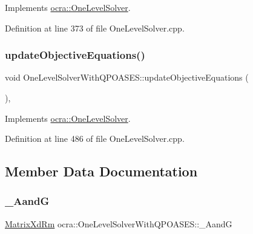 Implements \hyperlink{classocra_1_1OneLevelSolver_af592dc713af6cf22e67abcdfba09ca5e}{ocra\+::\+One\+Level\+Solver}.



Definition at line 373 of file One\+Level\+Solver.\+cpp.

\hypertarget{classocra_1_1OneLevelSolverWithQPOASES_a6a0e2cdfe22731fde09af26442a9cc85}{}\label{classocra_1_1OneLevelSolverWithQPOASES_a6a0e2cdfe22731fde09af26442a9cc85} 
\subsubsection{\texorpdfstring{update\+Objective\+Equations()}{updateObjectiveEquations()}}
{\footnotesize\ttfamily void One\+Level\+Solver\+With\+Q\+P\+O\+A\+S\+E\+S\+::update\+Objective\+Equations (\begin{DoxyParamCaption}{ }\end{DoxyParamCaption})\hspace{0.3cm}{\ttfamily [protected]}, {\ttfamily [virtual]}}



Implements \hyperlink{classocra_1_1OneLevelSolver_a150b377a35e30ae9c347147c10fddb33}{ocra\+::\+One\+Level\+Solver}.



Definition at line 486 of file One\+Level\+Solver.\+cpp.



\subsection{Member Data Documentation}
\hypertarget{classocra_1_1OneLevelSolverWithQPOASES_ae427c9c48cc3538994f0c2b6b06da7d6}{}\label{classocra_1_1OneLevelSolverWithQPOASES_ae427c9c48cc3538994f0c2b6b06da7d6} 
\subsubsection{\texorpdfstring{\+\_\+\+AandG}{\_AandG}}
{\footnotesize\ttfamily \hyperlink{group__solver_ga70eb87299c2fc1db3c4aac05df67d889}{Matrix\+Xd\+Rm} ocra\+::\+One\+Level\+Solver\+With\+Q\+P\+O\+A\+S\+E\+S\+::\+\_\+\+AandG\hspace{0.3cm}{\ttfamily [protected]}}



